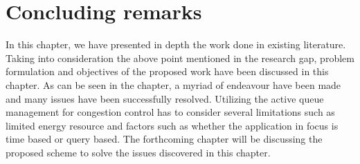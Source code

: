 \section{Concluding remarks}
In this chapter, we have presented in depth the work done in existing literature. Taking into consideration the above point mentioned in the research gap, problem formulation and objectives of the proposed work have been discussed in this chapter. 
As can be seen in the chapter, a myriad of endeavour have been made and many issues have been successfully resolved. Utilizing the active queue management for congestion control has to consider several limitations such as limited energy resource and factors such as whether the application in focus is time based or query based. 
The forthcoming chapter will be discussing the proposed scheme to solve the issues discovered in this chapter.

